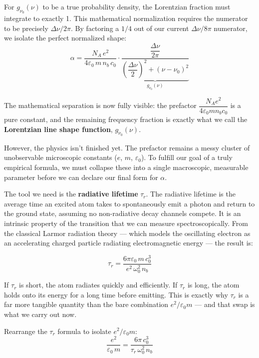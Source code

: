For $g_{\nu_0}(\nu)$ to be a true probability density, the Lorentzian fraction must integrate to exactly 1. This mathematical normalization requires the numerator to be precisely $\Delta\nu/2\pi$. By factoring a $1/4$ out of our current $\Delta\nu/8\pi$ numerator, we isolate the perfect normalized shape:
\begin{equation*}
    \alpha = \frac{N_A\,e^2}{4\varepsilon_0\,m\,n_b\,c_0}\cdot\underbrace{\frac{\dfrac{\Delta\nu}{2\pi}}{\left(\dfrac{\Delta\nu}{2}\right)^2 + (\nu - \nu_0)^2}}_{g_{\nu_0}(\nu)}
\end{equation*}

The mathematical separation is now fully visible: the prefactor $\dfrac{N_A e^2}{4\varepsilon_0 m n_b c_0}$ is a pure constant, and the remaining frequency fraction is exactly what we call the \textbf{Lorentzian line shape function}, $g_{\nu_0}(\nu)$.

However, the physics isn't finished yet. The prefactor remains a messy cluster of unobservable microscopic constants ($e$, $m$, $\varepsilon_0$). To fulfill our goal of a truly empirical formula, we must collapse these into a single macroscopic, measurable parameter before we can declare our final form for $\alpha$.

The tool we need is the \textbf{radiative lifetime} $\tau_r$. The radiative lifetime is the average time an excited atom takes to spontaneously emit a photon and return to the ground state, assuming no non-radiative decay channels compete. It is an intrinsic property of the transition that we can measure spectroscopically. From the classical Larmor radiation theory — which models the oscillating electron as an accelerating charged particle radiating electromagnetic energy — the result is:
\begin{keyresult}
    \begin{equation}
        \tau_r = \frac{6\pi\varepsilon_0\,m\,c_0^3}{e^2\,\omega_0^2\,n_b}
    \end{equation}
\end{keyresult}

If $\tau_r$ is short, the atom radiates quickly and efficiently. If $\tau_r$ is long, the atom holds onto its energy for a long time before emitting. This is exactly why $\tau_r$ is a far more tangible quantity than the bare combination $e^2/\varepsilon_0 m$ — and that swap is what we carry out now.

Rearrange the $\tau_r$ formula to isolate $e^2/\varepsilon_0 m$:
\begin{equation*}
    \frac{e^2}{\varepsilon_0\,m} = \frac{6\pi\,c_0^3}{\tau_r\,\omega_0^2\,n_b}
\end{equation*}

